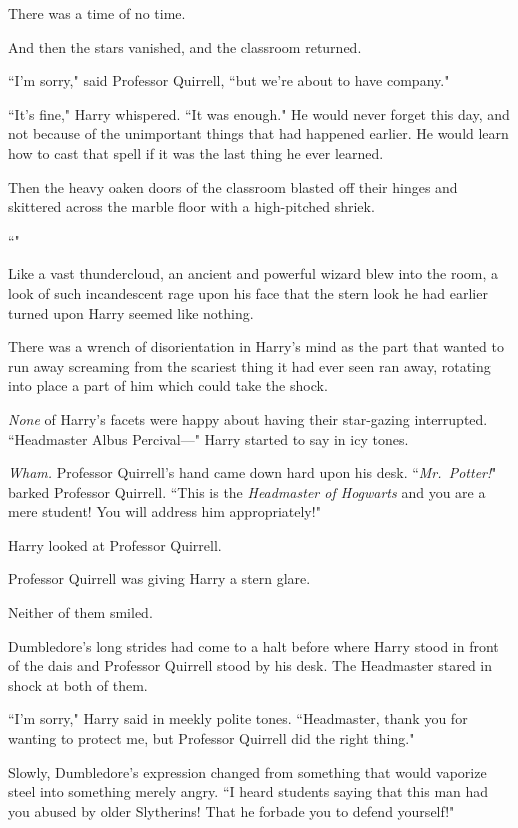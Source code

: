 There was a time of no time.

And then the stars vanished, and the classroom returned.

``I'm sorry," said Professor Quirrell, ``but we're about to have company."

``It's fine," Harry whispered. ``It was enough." He would never forget this day, and not because of the unimportant things that had happened earlier. He would learn how to cast that spell if it was the last thing he ever learned.

Then the heavy oaken doors of the classroom blasted off their hinges and skittered across the marble floor with a high-pitched shriek.

``"

Like a vast thundercloud, an ancient and powerful wizard blew into the room, a look of such incandescent rage upon his face that the stern look he had earlier turned upon Harry seemed like nothing.

There was a wrench of disorientation in Harry's mind as the part that wanted to run away screaming from the scariest thing it had ever seen ran away, rotating into place a part of him which could take the shock.

\emph{None} of Harry's facets were happy about having their star-gazing interrupted. ``Headmaster Albus Percival—" Harry started to say in icy tones.

\emph{Wham.} Professor Quirrell's hand came down hard upon his desk. ``\emph{Mr.~Potter!}" barked Professor Quirrell. ``This is the \emph{Headmaster of Hogwarts} and you are a mere student! You will address him appropriately!"

Harry looked at Professor Quirrell.

Professor Quirrell was giving Harry a stern glare.

Neither of them smiled.

Dumbledore's long strides had come to a halt before where Harry stood in front of the dais and Professor Quirrell stood by his desk. The Headmaster stared in shock at both of them.

``I'm sorry," Harry said in meekly polite tones. ``Headmaster, thank you for wanting to protect me, but Professor Quirrell did the right thing."

Slowly, Dumbledore's expression changed from something that would vaporize steel into something merely angry. ``I heard students saying that this man had you abused by older Slytherins! That he forbade you to defend yourself!"

